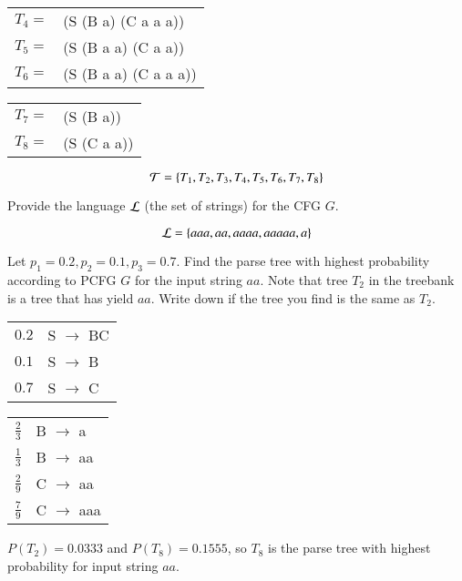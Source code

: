 \documentclass[12pt]{article}
\begin{document}
\begin{exe}
\begin{xlist}
\begin{soln}

\begin{center}
\begin{minipage}[t]{2.5in}
 \begin{tabular}{ll}
$T_4 = $ & (S (B a) (C a a a)) \\
$T_5 = $ & (S (B a a) (C a a)) \\
$T_6 = $ & (S (B a a) (C a a a))
 \end{tabular}
\end{minipage}
\begin{minipage}[t]{2.5in}
 \begin{tabular}{ll}
$T_7 = $ & (S (B a)) \\
$T_8 = $ & (S (C a a))
 \end{tabular}
\end{minipage}
\end{center}
\[ {\cal T} = \{ T_1, T_2, T_3, T_4, T_5, T_6, T_7, T_8  \} \]
\end{soln}

\smallskip
\ex Provide the language ${\cal L}$ (the set of strings) for the CFG $G$.

\begin{soln}
\[ {\cal L} = \{ aaa, aa, aaaa, aaaaa, a \} \]
\end{soln}

\smallskip
\ex Let $p_1 = 0.2, p_2 = 0.1, p_3 = 0.7$. Find the parse tree with highest probability according to PCFG $G$ for the input string $aa$. Note that tree $T_2$ in the treebank is a tree that has yield $aa$. Write down if the tree you find is the same as $T_2$.

\begin{soln}
\begin{minipage}[t]{2.5in}
 \begin{tabular}{ll}
 $0.2$ & S $\rightarrow$ BC \\
 $0.1$ & S $\rightarrow$ B \\
 $0.7$ & S $\rightarrow$ C
 \end{tabular}
\end{minipage}
\begin{minipage}[t]{2.5in}
 \begin{tabular}{ll}
 $\frac{2}{3}$ & B $\rightarrow$ a \\
 $\frac{1}{3}$ & B $\rightarrow$ aa \\
 $\frac{2}{9}$ & C $\rightarrow$ aa \\
 $\frac{7}{9}$ & C $\rightarrow$ aaa
 \end{tabular}
\end{minipage}

$P(T_2) = 0.0333$ and $P(T_8) = 0.1555$, so $T_8$ is the parse tree with highest probability for input string $aa$.
\end{soln}
\end{xlist}

\end{exe}
\end{document}
